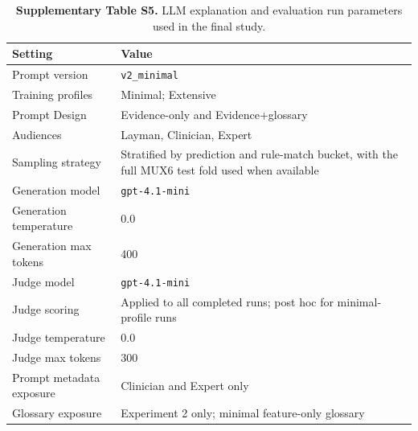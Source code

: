 \documentclass[11pt]{article}
\begin{document}
\begin{table}[H]
\caption*{\textbf{Supplementary Table S5.} LLM explanation and evaluation run parameters used in the final study.}
\label{tab:run-params-supp}
\centering
\small
\setlength{\tabcolsep}{3pt}
\renewcommand{\arraystretch}{1.05}
\begin{tabular}{L{0.43\columnwidth}L{0.47\columnwidth}}
\toprule
\textbf{Setting} & \textbf{Value} \\
\midrule
Prompt version & \texttt{v2\_minimal} \\
Training profiles & Minimal; Extensive \\
Prompt Design & Evidence-only and Evidence+glossary \\
Audiences & Layman, Clinician, Expert \\
Sampling strategy & Stratified by prediction and rule-match bucket, with the full MUX6 test fold used when available \\
Generation model & \texttt{gpt-4.1-mini} \\
Generation temperature & 0.0 \\
Generation max tokens & 400 \\
Judge model & \texttt{gpt-4.1-mini} \\
Judge scoring & Applied to all completed runs; post hoc for minimal-profile runs \\
Judge temperature & 0.0 \\
Judge max tokens & 300 \\
Prompt metadata exposure & Clinician and Expert only \\
Glossary exposure & Experiment 2 only; minimal feature-only glossary \\
\bottomrule
\end{tabular}
\end{table}
\end{document}
